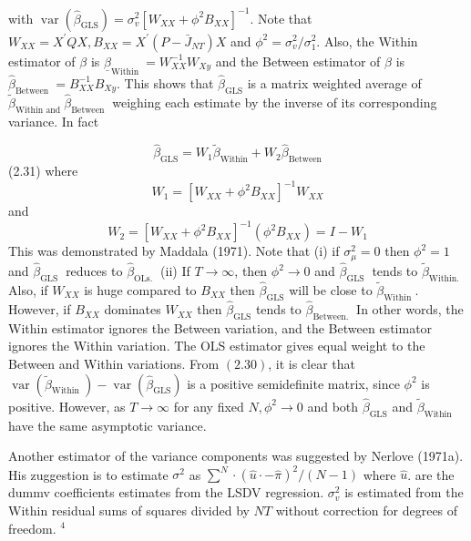 \documentclass[
]{book}
\begin{document}
with \(\operatorname{var}\left(\widehat{\beta}_{\mathrm{GLS}}\right)=\sigma_{v}^{2}\left[W_{X X}+\phi^{2} B_{X X}\right]^{-1} .\) Note that \(W_{X X}=X^{\prime} Q X, B_{X X}=X^{\prime}\left(P-\bar{J}_{N T}\right) X\) and \(\phi^{2}=\sigma_{v}^{2} / \sigma_{1}^{2}\). Also, the Within estimator of \(\beta\) is \(\underline{\beta}_{\text {Within }}=W_{X X}^{-1} W_{X y}\) and the Between estimator of \(\beta\) is \(\widehat{\beta}_{\text {Between }}=B_{X X}^{-1} B_{X y} .\) This shows that \(\widehat{\beta}_{\mathrm{GLS}}\) is a matrix weighted average of \(\widetilde{\beta}_{\text {Within and }} \widehat{\beta}_{\text {Between }}\) weighing each estimate by the inverse of its corresponding variance. In fact

\begin{equation}
\widehat{\beta}_{\mathrm{GLS}}=W_{1} \widetilde{\beta}_{\mathrm{Within}}+W_{2} \widehat{\beta}_{\mathrm{Between}}
\end{equation} (2.31) where \[
W_{1}=\left[W_{X X}+\phi^{2} B_{X X}\right]^{-1} W_{X X}
\] and \[
W_{2}=\left[W_{X X}+\phi^{2} B_{X X}\right]^{-1}\left(\phi^{2} B_{X X}\right)=I-W_{1}
\] This was demonstrated by Maddala (1971). Note that (i) if \(\sigma_{\mu}^{2}=0\) then \(\phi^{2}=1\) and \(\widehat{\beta}_{\text {GLS }}\) reduces to \(\widehat{\beta}_{\text {OLs. }}\) (ii) If \(T \rightarrow \infty\), then \(\phi^{2} \rightarrow 0\) and \(\widehat{\beta}_{\text {GLS }}\) tends to \(\widetilde{\beta}_{\text {Within. }}\) Also, if \(W_{X X}\) is huge compared to \(B_{X X}\) then \(\widehat{\beta}_{\mathrm{GLS}}\) will be close to \(\widetilde{\beta}_{\text {Within }}\). However, if \(B_{X X}\) dominates \(W_{X X}\) then \(\widehat{\beta}_{\mathrm{GLS}}\) tends to \(\widehat{\beta}_{\text {Between. }}\) In other words, the Within estimator ignores the Between variation, and the Between estimator ignores the Within variation. The OLS estimator gives equal weight to the Between and Within variations. From \((2.30)\), it is clear that \(\operatorname{var}\left(\widetilde{\beta}_{\text {Within }}\right)-\operatorname{var}\left(\hat{\beta}_{\mathrm{GLS}}\right)\) is a positive semidefinite matrix, since \(\phi^{2}\) is positive. However, as \(T \rightarrow \infty\) for any fixed \(N, \phi^{2} \rightarrow 0\) and both \(\widehat{\beta}_{\mathrm{GLS}}\) and \(\widetilde{\beta}_{\text {Within }}\) have the same asymptotic variance.

Another estimator of the variance components was suggested by Nerlove (1971a). His zuggestion is to estimate \(\sigma^{2}\) as \(\sum^{N} \cdot(\widehat{u} \cdot-\widehat{\pi})^{2} /(N-1)\) where \(\widehat{u}\). are the dummv coefficients estimates from the LSDV regression. \(\sigma_{v}^{2}\) is estimated from the Within residual sums of squares divided by \(N T\) without correction for degrees of freedom. \({ }^{4}\)
\end{document}
